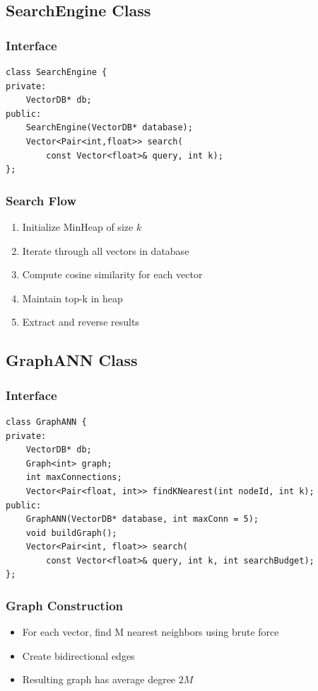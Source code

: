 \documentclass[12pt,a4paper]{article}
\begin{document}
\subsection{SearchEngine Class}

\subsubsection{Interface}
\begin{lstlisting}
class SearchEngine {
private:
    VectorDB* db;
public:
    SearchEngine(VectorDB* database);
    Vector<Pair<int,float>> search(
        const Vector<float>& query, int k);
};
\end{lstlisting}

\subsubsection{Search Flow}
\begin{enumerate}
    \item Initialize MinHeap of size $k$
    \item Iterate through all vectors in database
    \item Compute cosine similarity for each vector
    \item Maintain top-k in heap
    \item Extract and reverse results
\end{enumerate}

\subsection{GraphANN Class}

\subsubsection{Interface}
\begin{lstlisting}
class GraphANN {
private:
    VectorDB* db;
    Graph<int> graph;
    int maxConnections;
    Vector<Pair<float, int>> findKNearest(int nodeId, int k);
public:
    GraphANN(VectorDB* database, int maxConn = 5);
    void buildGraph();
    Vector<Pair<int, float>> search(
        const Vector<float>& query, int k, int searchBudget);
};
\end{lstlisting}

\subsubsection{Graph Construction}
\begin{itemize}
    \item For each vector, find M nearest neighbors using brute force
    \item Create bidirectional edges
    \item Resulting graph has average degree $2M$
\end{itemize}
\end{document}
